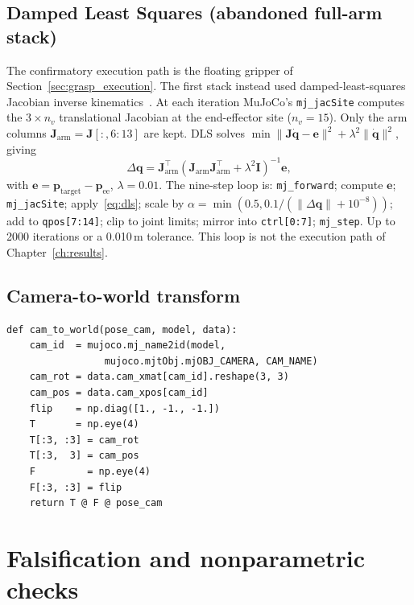 \documentclass[11pt,a4paper]{report}
\begin{document}
\section{Damped Least Squares (abandoned full-arm stack)}
\label{app:dls}

The confirmatory execution path is the floating gripper of Section~\ref{sec:grasp_execution}. The first stack instead used damped-least-squares Jacobian inverse kinematics~\cite{nakamura1986inverse}. At each iteration MuJoCo's \texttt{mj\_jacSite} computes the $3 \times n_v$ translational Jacobian at the end-effector site ($n_v = 15$). Only the arm columns $\mathbf{J}_{\text{arm}} = \mathbf{J}[:, 6{:}13]$ are kept. DLS solves $\min \|\mathbf{J}\dot{\mathbf{q}} - \mathbf{e}\|^2 + \lambda^2\|\dot{\mathbf{q}}\|^2$, giving
\begin{equation}
  \Delta\mathbf{q} = \mathbf{J}_{\text{arm}}^{\top}
    \left(\mathbf{J}_{\text{arm}} \mathbf{J}_{\text{arm}}^{\top}
    + \lambda^2 \mathbf{I}\right)^{-1} \mathbf{e},
  \label{eq:dls}
\end{equation}
with $\mathbf{e} = \mathbf{p}_{\text{target}} - \mathbf{p}_{\text{ee}}$, $\lambda = 0.01$. The nine-step loop is: \texttt{mj\_forward}; compute $\mathbf{e}$; \texttt{mj\_jacSite}; apply~\eqref{eq:dls}; scale by $\alpha = \min(0.5, 0.1 / (\|\Delta\mathbf{q}\| + 10^{-8}))$; add to \texttt{qpos[7:14]}; clip to joint limits; mirror into \texttt{ctrl[0:7]}; \texttt{mj\_step}. Up to 2000 iterations or a 0.010\,m tolerance. This loop is not the execution path of Chapter~\ref{ch:results}.

\section{Camera-to-world transform}
\label{app:cam_to_world}

\begin{lstlisting}[caption={Camera-to-world frame transformation.},label={lst:cam_to_world}]
def cam_to_world(pose_cam, model, data):
    cam_id  = mujoco.mj_name2id(model,
                 mujoco.mjtObj.mjOBJ_CAMERA, CAM_NAME)
    cam_rot = data.cam_xmat[cam_id].reshape(3, 3)
    cam_pos = data.cam_xpos[cam_id]
    flip    = np.diag([1., -1., -1.])
    T       = np.eye(4)
    T[:3, :3] = cam_rot
    T[:3,  3] = cam_pos
    F         = np.eye(4)
    F[:3, :3] = flip
    return T @ F @ pose_cam
\end{lstlisting}

\chapter{Falsification and nonparametric checks}
\label{app:falsification}
\label{app:nonparametric}
\end{document}
